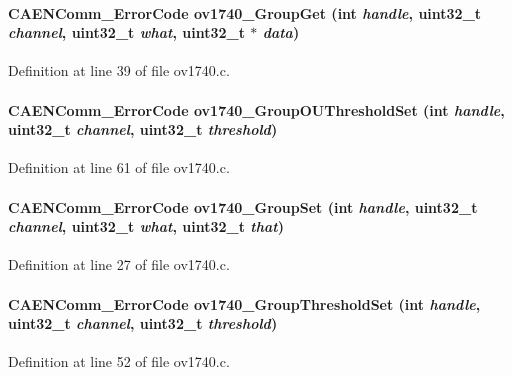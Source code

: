 \paragraph[{ov1740\_\-GroupGet}]{\setlength{\rightskip}{0pt plus 5cm}CAENComm\_\-ErrorCode ov1740\_\-GroupGet (int {\em handle}, \/  uint32\_\-t {\em channel}, \/  uint32\_\-t {\em what}, \/  uint32\_\-t $\ast$ {\em data})}\hfill\label{ov1740_8c_a080182f74c40dcfacb086f2906ebd977}


Definition at line 39 of file ov1740.c.
\paragraph[{ov1740\_\-GroupOUThresholdSet}]{\setlength{\rightskip}{0pt plus 5cm}CAENComm\_\-ErrorCode ov1740\_\-GroupOUThresholdSet (int {\em handle}, \/  uint32\_\-t {\em channel}, \/  uint32\_\-t {\em threshold})}\hfill\label{ov1740_8c_ac4f9aa7362df12c907d717831d16fe98}


Definition at line 61 of file ov1740.c.
\paragraph[{ov1740\_\-GroupSet}]{\setlength{\rightskip}{0pt plus 5cm}CAENComm\_\-ErrorCode ov1740\_\-GroupSet (int {\em handle}, \/  uint32\_\-t {\em channel}, \/  uint32\_\-t {\em what}, \/  uint32\_\-t {\em that})}\hfill\label{ov1740_8c_ab50e78553643da4ad04e9b3a952da71d}


Definition at line 27 of file ov1740.c.
\paragraph[{ov1740\_\-GroupThresholdSet}]{\setlength{\rightskip}{0pt plus 5cm}CAENComm\_\-ErrorCode ov1740\_\-GroupThresholdSet (int {\em handle}, \/  uint32\_\-t {\em channel}, \/  uint32\_\-t {\em threshold})}\hfill\label{ov1740_8c_ae25b7a625758fcc417ddf995d34f9b62}


Definition at line 52 of file ov1740.c.
